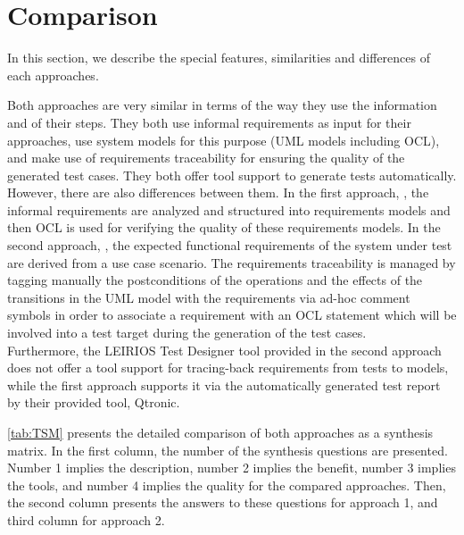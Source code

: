 \section{Comparison}
\label{sec:Compar}

In this section, we describe the special features, similarities and differences of each approaches.

Both approaches are very similar in terms of the way they use the information and of their steps. They both use informal requirements as input for their approaches, use system models for this purpose (UML models including OCL), and make use of requirements traceability for ensuring the quality of the generated test cases. They both offer tool support to generate tests automatically. \\
However, there are also differences between them. In the first approach, \cite{Paper1}, the informal requirements are analyzed and structured into requirements models and then OCL is used for verifying the quality of these requirements models.
In the second approach, \cite{Paper2}, the expected functional requirements of the system under test are derived from a use case scenario. The requirements traceability is managed by tagging manually the postconditions of the operations and the effects of the transitions in the UML model with the requirements via ad-hoc comment symbols in order to associate a requirement with an OCL statement which will be involved into a test target during the generation of the test cases. \\
Furthermore, the LEIRIOS Test Designer tool provided in the second approach does not offer a tool support for tracing-back requirements from tests to models, while the first approach supports it via the automatically generated test report by their provided tool, Qtronic.

\autoref{tab:TSM} presents the detailed comparison of both approaches as a synthesis matrix. In the first column, the number of the synthesis questions are presented. Number 1 implies the description, number 2 implies the benefit, number 3 implies the tools, and number 4 implies the quality for the compared approaches. Then, the second column presents the answers to these questions for approach 1, and third column for approach 2. 

